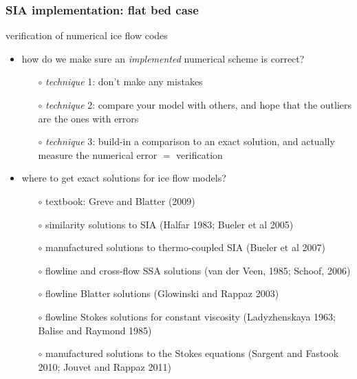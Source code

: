 \begin{frame}
  \frametitle{SIA implementation: flat bed case}


\end{frame}


\begin{frame}{verification of numerical ice flow codes}
\begin{itemize}
\item how do we make sure an \emph{implemented} numerical scheme is correct?
  \begin{itemize}
  \item[$\circ$] \emph{technique} 1: don't make any mistakes
  \item[$\circ$] \emph{technique} 2: compare your model with others, and hope that the outliers are the ones with errors
  \item[$\circ$] \emph{technique} 3: build-in a comparison to an exact solution, and actually measure the numerical error \alert{$=$ verification}
  \end{itemize}
\item where to get exact solutions for ice flow models?
  \begin{itemize}
  \item[$\circ$] textbook: Greve and Blatter (2009)
  \item[$\circ$] similarity solutions to SIA (Halfar 1983; Bueler et al 2005)
  \item[$\circ$] manufactured solutions to thermo-coupled SIA (Bueler et al 2007)
  \item[$\circ$] flowline and cross-flow SSA solutions (van der Veen, 1985; Schoof, 2006)
  \item[$\circ$] flowline Blatter solutions (Glowinski and Rappaz 2003)
  \item[$\circ$] flowline Stokes solutions for constant viscosity (Ladyzhenskaya 1963; Balise and Raymond 1985)
  \item[$\circ$] manufactured solutions to the Stokes equations (Sargent and Fastook 2010; Jouvet and Rappaz 2011)
  \end{itemize}
\end{itemize}
\end{frame}


